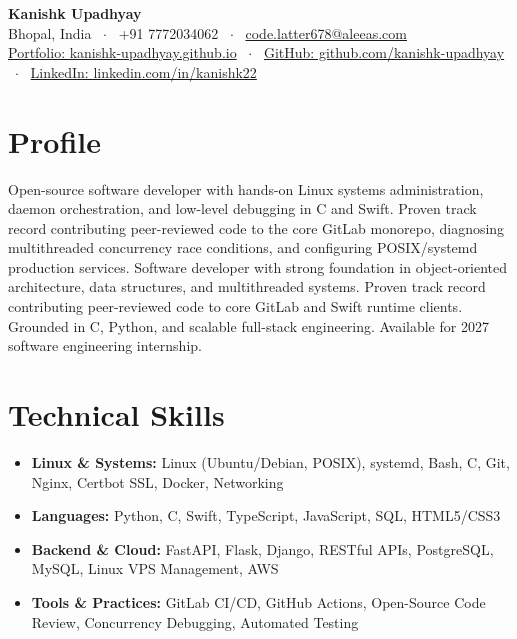 \documentclass[10pt,a4paper]{article}
\begin{document}
\begin{center}
    {\huge \textbf{Kanishk Upadhyay}} \\ \vspace{2pt}
    Bhopal, India \ $\cdot$ \ +91 7772034062 \ $\cdot$ \ \href{mailto:code.latter678@aleeas.com}{code.latter678@aleeas.com} \\ \vspace{2pt}
    \href{https://kanishk-upadhyay.github.io/}{Portfolio: kanishk-upadhyay.github.io} \ $\cdot$ \ 
    \href{https://github.com/kanishk-upadhyay}{GitHub: github.com/kanishk-upadhyay} \ $\cdot$ \ 
    \href{https://linkedin.com/in/kanishk22}{LinkedIn: linkedin.com/in/kanishk22}
\end{center}

\vspace{-6pt}
\section{Profile}
Open-source software developer with hands-on Linux systems administration, daemon orchestration, and low-level debugging in C and Swift. Proven track record contributing peer-reviewed code to the core GitLab monorepo, diagnosing multithreaded concurrency race conditions, and configuring POSIX/systemd production services. Software developer with strong foundation in object-oriented architecture, data structures, and multithreaded systems. Proven track record contributing peer-reviewed code to core GitLab and Swift runtime clients. Grounded in C, Python, and scalable full-stack engineering. Available for 2027 software engineering internship.

\section{Technical Skills}
\begin{itemize}
    \item \textbf{Linux \& Systems:} Linux (Ubuntu/Debian, POSIX), systemd, Bash, C, Git, Nginx, Certbot SSL, Docker, Networking
    \item \textbf{Languages:} Python, C, Swift, TypeScript, JavaScript, SQL, HTML5/CSS3
    \item \textbf{Backend \& Cloud:} FastAPI, Flask, Django, RESTful APIs, PostgreSQL, MySQL, Linux VPS Management, AWS
    \item \textbf{Tools \& Practices:} GitLab CI/CD, GitHub Actions, Open-Source Code Review, Concurrency Debugging, Automated Testing
\end{itemize}
\end{document}
